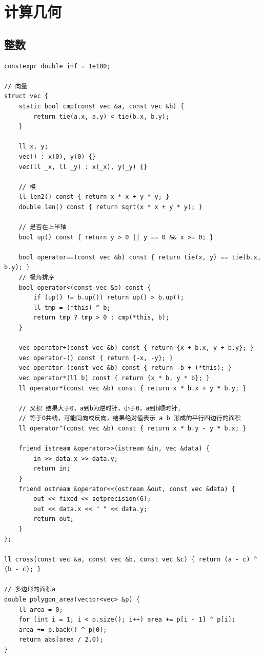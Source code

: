 \documentclass[UTF8]{ctexart}
\begin{document}
\begin{sloppypar}
\clearpage

\section{计算几何}

\subsection{整数}

\begin{lstlisting}[style=cpp]
constexpr double inf = 1e100;

// 向量
struct vec {
    static bool cmp(const vec &a, const vec &b) {
        return tie(a.x, a.y) < tie(b.x, b.y);
    }

    ll x, y;
    vec() : x(0), y(0) {}
    vec(ll _x, ll _y) : x(_x), y(_y) {}

    // 模
    ll len2() const { return x * x + y * y; }
    double len() const { return sqrt(x * x + y * y); }

    // 是否在上半轴
    bool up() const { return y > 0 || y == 0 && x >= 0; }

    bool operator==(const vec &b) const { return tie(x, y) == tie(b.x, b.y); }
    // 极角排序
    bool operator<(const vec &b) const {
        if (up() != b.up()) return up() > b.up();
        ll tmp = (*this) ^ b;
        return tmp ? tmp > 0 : cmp(*this, b);
    }

    vec operator+(const vec &b) const { return {x + b.x, y + b.y}; }
    vec operator-() const { return {-x, -y}; }
    vec operator-(const vec &b) const { return -b + (*this); }
    vec operator*(ll b) const { return {x * b, y * b}; }
    ll operator*(const vec &b) const { return x * b.x + y * b.y; }

    // 叉积 结果大于0，a到b为逆时针，小于0，a到b顺时针,
    // 等于0共线，可能同向或反向，结果绝对值表示 a b 形成的平行四边行的面积
    ll operator^(const vec &b) const { return x * b.y - y * b.x; }

    friend istream &operator>>(istream &in, vec &data) {
        in >> data.x >> data.y;
        return in;
    }
    friend ostream &operator<<(ostream &out, const vec &data) {
        out << fixed << setprecision(6);
        out << data.x << " " << data.y;
        return out;
    }
};

ll cross(const vec &a, const vec &b, const vec &c) { return (a - c) ^ (b - c); }

// 多边形的面积a
double polygon_area(vector<vec> &p) {
    ll area = 0;
    for (int i = 1; i < p.size(); i++) area += p[i - 1] ^ p[i];
    area += p.back() ^ p[0];
    return abs(area / 2.0);
}


\end{lstlisting}
\end{sloppypar}
\end{document}
